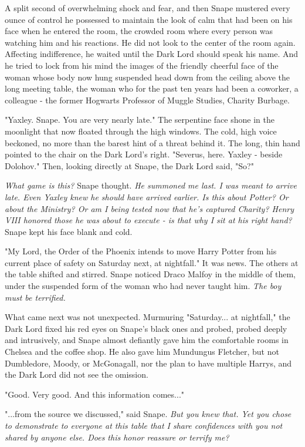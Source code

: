 A split second of overwhelming shock and fear, and then Snape mustered every ounce of control he possessed to maintain the look of calm that had been on his face when he entered the room, the crowded room where every person was watching him and his reactions. He did not look to the center of the room again. Affecting indifference, he waited until the Dark Lord should speak his name. And he tried to lock from his mind the images of the friendly cheerful face of the woman whose body now hung suspended head down from the ceiling above the long meeting table, the woman who for the past ten years had been a coworker, a colleague - the former Hogwarts Professor of Muggle Studies, Charity Burbage.

"Yaxley. Snape. You are very nearly late." The serpentine face shone in the moonlight that now floated through the high windows. The cold, high voice beckoned, no more than the barest hint of a threat behind it. The long, thin hand pointed to the chair on the Dark Lord's right. "Severus, here. Yaxley - beside Dolohov." Then, looking directly at Snape, the Dark Lord said, "So?"

\emph{What game is this?} Snape thought. \emph{He summoned me last. I was meant to arrive late. Even Yaxley knew he should have arrived earlier. Is this about Potter? Or about the Ministry? Or am I being tested now that he's captured Charity? Henry VIII honored those he was about to execute - is that why I sit at his right hand?} Snape kept his face blank and cold.

"My Lord, the Order of the Phoenix intends to move Harry Potter from his current place of safety on Saturday next, at nightfall." It was news. The others at the table shifted and stirred. Snape noticed Draco Malfoy in the middle of them, under the suspended form of the woman who had never taught him. \emph{The boy must be terrified.}

What came next was not unexpected. Murmuring "Saturday... at nightfall," the Dark Lord fixed his red eyes on Snape's black ones and probed, probed deeply and intrusively, and Snape almost defiantly gave him the comfortable rooms in Chelsea and the coffee shop. He also gave him Mundungus Fletcher, but not Dumbledore, Moody, or McGonagall, nor the plan to have multiple Harrys, and the Dark Lord did not see the omission.

"Good. Very good. And this information comes..."

"...from the source we discussed," said Snape. \emph{But you knew that. Yet you chose to demonstrate to everyone at this table that I share confidences with you not shared by anyone else. Does this honor reassure or terrify me?}

